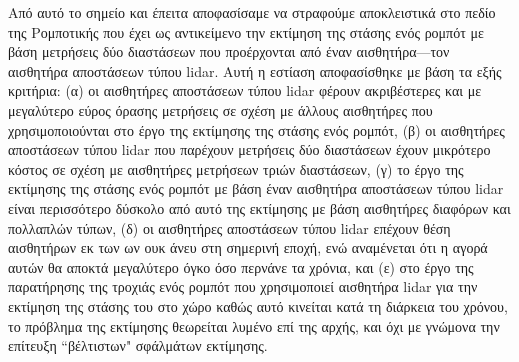 Από αυτό το σημείο και έπειτα αποφασίσαμε να στραφούμε αποκλειστικά στο πεδίο
της Ρομποτικής που έχει ως αντικείμενο την εκτίμηση της στάσης ενός ρομπότ με
βάση μετρήσεις δύο διαστάσεων που προέρχονται από έναν αισθητήρα---τον
αισθητήρα αποστάσεων τύπου lidar. Αυτή η εστίαση αποφασίσθηκε με βάση τα εξής
κριτήρια: (α) οι αισθητήρες αποστάσεων τύπου lidar φέρουν ακριβέστερες και
με μεγαλύτερο εύρος όρασης μετρήσεις σε σχέση με άλλους αισθητήρες που
χρησιμοποιούνται στο έργο της εκτίμησης της στάσης ενός ρομπότ, (β) οι
αισθητήρες αποστάσεων τύπου lidar που παρέχουν μετρήσεις δύο διαστάσεων έχουν
μικρότερο κόστος σε σχέση με αισθητήρες μετρήσεων τριών διαστάσεων, (γ) το έργο
της εκτίμησης της στάσης ενός ρομπότ με βάση έναν αισθητήρα αποστάσεων τύπου
lidar είναι περισσότερο δύσκολο από αυτό της εκτίμησης με βάση αισθητήρες
διαφόρων και πολλαπλών τύπων, (δ) οι αισθητήρες αποστάσεων τύπου lidar επέχουν
θέση αισθητήρων εκ των ων ουκ άνευ στη σημερινή εποχή, ενώ αναμένεται ότι η
αγορά αυτών θα αποκτά μεγαλύτερο όγκο όσο περνάνε τα χρόνια, και (ε) στο έργο
της παρατήρησης της τροχιάς ενός ρομπότ που χρησιμοποιεί αισθητήρα lidar για
την εκτίμηση της στάσης του στο χώρο καθώς αυτό κινείται κατά τη διάρκεια του
χρόνου, το πρόβλημα της εκτίμησης θεωρείται λυμένο επί της αρχής, και όχι με
γνώμονα την επίτευξη ``βέλτιστων" σφάλμάτων εκτίμησης.

